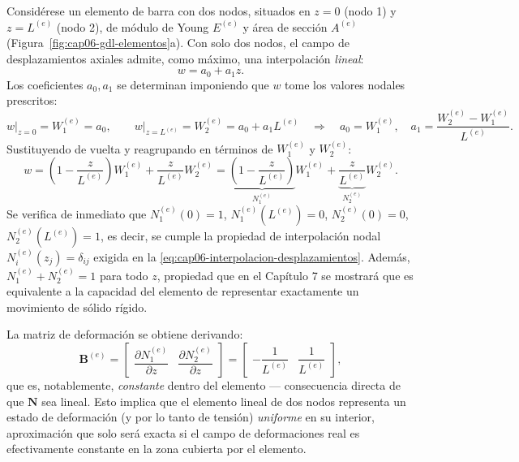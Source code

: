 Considérese un elemento de barra con dos nodos, situados en $z=0$ (nodo 1) y $z=L^{(e)}$ (nodo 2), de módulo de Young $E^{(e)}$ y área de sección $A^{(e)}$ (Figura~\ref{fig:cap06-gdl-elementos}a). Con solo dos nodos, el campo de desplazamientos axiales admite, como máximo, una interpolación \emph{lineal}:
\[
w = a_0 + a_1 z .
\]
Los coeficientes $a_0, a_1$ se determinan imponiendo que $w$ tome los valores nodales prescritos:
\[
w\big|_{z=0} = W_1^{(e)} = a_0, \qquad w\big|_{z=L^{(e)}} = W_2^{(e)} = a_0 + a_1 L^{(e)} \quad\Longrightarrow\quad a_0 = W_1^{(e)}, \quad a_1 = \frac{W_2^{(e)} - W_1^{(e)}}{L^{(e)}} .
\]
Sustituyendo de vuelta y reagrupando en términos de $W_1^{(e)}$ y $W_2^{(e)}$:
\[
w = \left(1 - \frac{z}{L^{(e)}}\right) W_1^{(e)} + \frac{z}{L^{(e)}} W_2^{(e)} = \underbrace{\left(1-\frac{z}{L^{(e)}}\right)}_{N_1^{(e)}} W_1^{(e)} + \underbrace{\frac{z}{L^{(e)}}}_{N_2^{(e)}} W_2^{(e)} .
\]
Se verifica de inmediato que $N_1^{(e)}(0)=1$, $N_1^{(e)}(L^{(e)})=0$, $N_2^{(e)}(0)=0$, $N_2^{(e)}(L^{(e)})=1$, es decir, se cumple la propiedad de interpolación nodal $N_i^{(e)}(z_j)=\delta_{ij}$ exigida en la \cref{eq:cap06-interpolacion-desplazamientos}. Además, $N_1^{(e)}+N_2^{(e)}=1$ para todo $z$, propiedad que en el Capítulo 7 se mostrará que es equivalente a la capacidad del elemento de representar exactamente un movimiento de sólido rígido.

La matriz de deformación se obtiene derivando:
\[
\bm B^{(e)} = \begin{bmatrix} \dfrac{\partial N_1^{(e)}}{\partial z} & \dfrac{\partial N_2^{(e)}}{\partial z} \end{bmatrix} = \begin{bmatrix} -\dfrac{1}{L^{(e)}} & \dfrac{1}{L^{(e)}} \end{bmatrix} ,
\]
que es, notablemente, \emph{constante} dentro del elemento --- consecuencia directa de que $\bm N$ sea lineal. Esto implica que el elemento lineal de dos nodos representa un estado de deformación (y por lo tanto de tensión) \emph{uniforme} en su interior, aproximación que solo será exacta si el campo de deformaciones real es efectivamente constante en la zona cubierta por el elemento.


